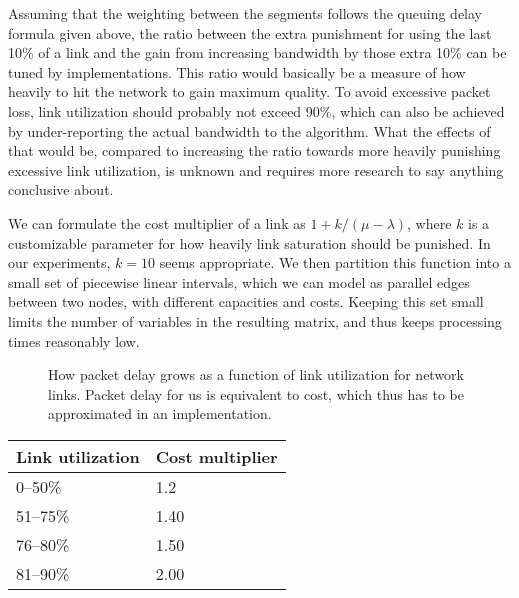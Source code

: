 Assuming that the weighting between the segments follows the queuing delay formula given above, the ratio between the extra punishment for using the last 10\% of a link and the gain from increasing bandwidth by those extra 10\% can be tuned by implementations. This ratio would basically be a measure of how heavily to hit the network to gain maximum quality. To avoid excessive packet loss, link utilization should probably not exceed 90\%, which can also be achieved by under-reporting the actual bandwidth to the algorithm. What the effects of that would be, compared to increasing the ratio towards more heavily punishing excessive link utilization, is unknown and requires more research to say anything conclusive about.

We can formulate the cost multiplier of a link as $1 + k/(\mu - \lambda)$, where $k$ is a customizable parameter for how heavily link saturation should be punished. In our experiments, $k=10$ seems appropriate. We then partition this function into a small set of piecewise linear intervals, which we can model as parallel edges between two nodes, with different capacities and costs. Keeping this set small limits the number of variables in the resulting matrix, and thus keeps processing times reasonably low.

\begin{figure}
    \centering
    \caption{How packet delay grows as a function of link utilization for network links. Packet delay for us is equivalent to cost, which thus has to be approximated in an implementation.}
    \label{fig:utility-latency}
\end{figure}


\begin{center}
    \label{tab:utilization-to-cost}
    \begin{tabular}{| l | l |}
    \hline
    \textbf{Link utilization} & \textbf{Cost multiplier} \\ \hline
    0--50\% & 1.2 \\ \hline
    51--75\% & 1.40 \\ \hline
    76--80\% & 1.50 \\ \hline
    81--90\% & 2.00 \\ \hline
    \end{tabular}
\end{center}

